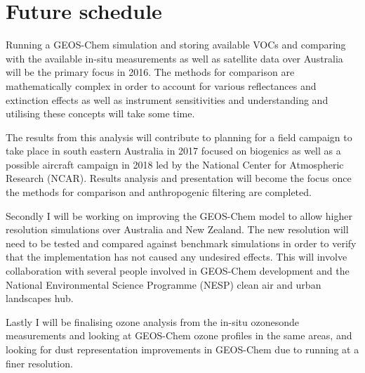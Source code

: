 \section{Future schedule}

Running a GEOS-Chem simulation and storing available VOCs and comparing with the available in-situ measurements as well as satellite data over Australia will be the primary focus in 2016.
The methods for comparison are mathematically complex in order to account for various reflectances and extinction effects as well as instrument sensitivities and understanding and utilising these concepts will take some time.

The results from this analysis will contribute to planning for a field campaign to take place in south eastern Australia in 2017 focused on biogenics as well as a possible aircraft campaign in 2018 led by the National Center for Atmospheric Research (NCAR).
Results analysis and presentation will become the focus once the methods for comparison and anthropogenic filtering are completed.

Secondly I will be working on improving the GEOS-Chem model to allow higher resolution simulations over Australia and New Zealand.
The new resolution will need to be tested and compared against benchmark simulations in order to verify that the implementation has not caused any undesired effects.
This will involve collaboration with several people involved in GEOS-Chem development and the National Environmental Science Programme (NESP) clean air and urban landscapes hub.

Lastly I will be finalising ozone analysis from the in-situ ozonesonde measurements and looking at GEOS-Chem ozone profiles in the same areas, and looking for dust representation improvements in GEOS-Chem due to running at a finer resolution.

